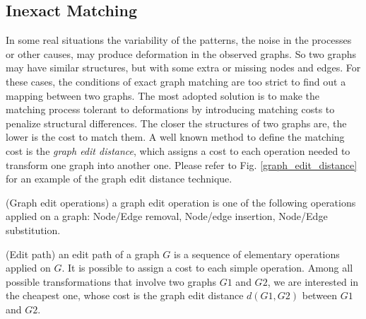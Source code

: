 \subsection{Inexact Matching} 
In some real situations the variability of the patterns, the noise in the processes or other causes, may produce deformation in the observed graphs. So two graphs may have similar structures, but with some extra or missing nodes and edges. For these cases, the conditions of exact graph matching are too strict to find out a mapping between two graphs. The most adopted solution is to make the matching process tolerant to deformations by introducing matching costs to penalize structural differences. The closer the structures of two graphs are, the lower is the cost to match them. A well known method to define the matching cost is the \textit{graph edit distance}, which assigns a cost to each operation needed to transform one graph into another one. Please refer to Fig. \ref{graph_edit_distance} for an example of the graph edit distance technique. 
%
\theoremstyle{definition}
\begin{definition}{(Graph edit operations)}
	a graph edit operation is one of the following operations applied on a graph: Node/Edge removal, Node/edge insertion, Node/Edge substitution.
\end{definition}
%
\theoremstyle{definition}
\begin{definition}{(Edit path)}
	an edit path of a graph $G$ is a sequence of elementary operations applied on $G$. It is possible to assign a cost to each simple operation. Among all possible transformations that involve two graphs $G1$ and $G2$, we are interested in the cheapest one, whose cost is the graph edit distance $d(G1,G2)$ between $G1$ and $G2$. 
\end{definition}
%
